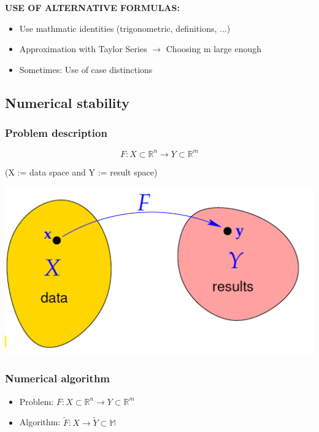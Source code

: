 \documentclass[12pt, a4paper]{article}
\newcommand{\R}{\mathbb{R}}
\newcommand{\M}{\mathbb{M}}
\begin{document}
 \begin{tcolorbox}
 \textbf{USE OF ALTERNATIVE FORMULAS:}
 \begin{itemize}
  \item Use mathmatic identities (trigonometric, definitions, ...)
  \item Approximation with Taylor Series $\rightarrow$ Choosing m large enough
  \item Sometimes: Use of case distinctions
\end{itemize}
\end{tcolorbox}


\subsection{Numerical stability}

\subsubsection{Problem description}
\begin{minipage}{0.6\textwidth}
	\begin{equation*}
	F: X \subset \R^{n} \longrightarrow Y \subset \R^{m}	
	\end{equation*}
	\begin{center}
		(X := data space and Y := result space)
	\end{center}
\end{minipage}
\begin{minipage}{0.3\textwidth}\raggedleft
	\begin{center}
	 \includegraphics[width=1.0\textwidth]{stable_problem_desc.png}
\end{center}
\end{minipage}


\subsubsection{Numerical algorithm}
\begin{itemize}
	\item Problem: \quad  \quad $F: X \subset \R^{n} \longrightarrow Y \subset \R^{m}	$
	\item Algorithm: \quad  $\tilde{F}: X \rightarrow \tilde{Y} \subset \M$
\end{itemize}
\end{document}
